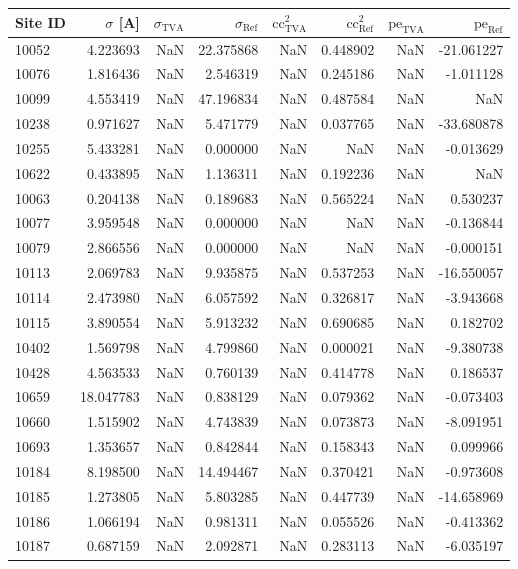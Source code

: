 \begin{tabular}{lrrrrrrr}
\toprule
Site ID & $\sigma$ [A] & $\sigma_\text{TVA}$ & $\sigma_\text{Ref}$ & $\text{cc}^2_\text{TVA}$ & $\text{cc}^2_\text{Ref}$ & $\text{pe}_\text{TVA}$ & $\text{pe}_\text{Ref}$ \\
\midrule
10052 & 4.223693 & NaN & 22.375868 & NaN & 0.448902 & NaN & -21.061227 \\
10076 & 1.816436 & NaN & 2.546319 & NaN & 0.245186 & NaN & -1.011128 \\
10099 & 4.553419 & NaN & 47.196834 & NaN & 0.487584 & NaN & NaN \\
10238 & 0.971627 & NaN & 5.471779 & NaN & 0.037765 & NaN & -33.680878 \\
10255 & 5.433281 & NaN & 0.000000 & NaN & NaN & NaN & -0.013629 \\
10622 & 0.433895 & NaN & 1.136311 & NaN & 0.192236 & NaN & NaN \\
10063 & 0.204138 & NaN & 0.189683 & NaN & 0.565224 & NaN & 0.530237 \\
10077 & 3.959548 & NaN & 0.000000 & NaN & NaN & NaN & -0.136844 \\
10079 & 2.866556 & NaN & 0.000000 & NaN & NaN & NaN & -0.000151 \\
10113 & 2.069783 & NaN & 9.935875 & NaN & 0.537253 & NaN & -16.550057 \\
10114 & 2.473980 & NaN & 6.057592 & NaN & 0.326817 & NaN & -3.943668 \\
10115 & 3.890554 & NaN & 5.913232 & NaN & 0.690685 & NaN & 0.182702 \\
10402 & 1.569798 & NaN & 4.799860 & NaN & 0.000021 & NaN & -9.380738 \\
10428 & 4.563533 & NaN & 0.760139 & NaN & 0.414778 & NaN & 0.186537 \\
10659 & 18.047783 & NaN & 0.838129 & NaN & 0.079362 & NaN & -0.073403 \\
10660 & 1.515902 & NaN & 4.743839 & NaN & 0.073873 & NaN & -8.091951 \\
10693 & 1.353657 & NaN & 0.842844 & NaN & 0.158343 & NaN & 0.099966 \\
10184 & 8.198500 & NaN & 14.494467 & NaN & 0.370421 & NaN & -0.973608 \\
10185 & 1.273805 & NaN & 5.803285 & NaN & 0.447739 & NaN & -14.658969 \\
10186 & 1.066194 & NaN & 0.981311 & NaN & 0.055526 & NaN & -0.413362 \\
10187 & 0.687159 & NaN & 2.092871 & NaN & 0.283113 & NaN & -6.035197 \\

\end{tabular}
